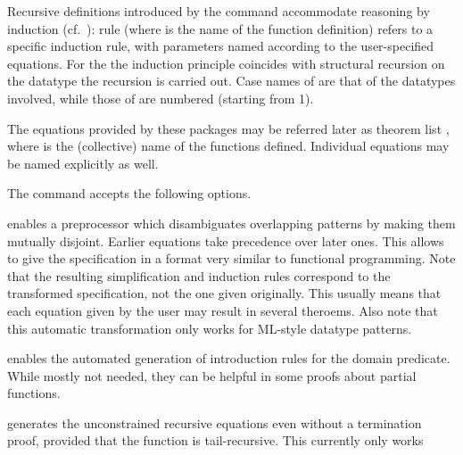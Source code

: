 \begin{isabellebody}
\begin{isamarkuptext}
\begin{description}
  \end{description}


  Recursive definitions introduced by the \hyperlink{command.HOL.function}{\mbox{}}
  command accommodate
  reasoning by induction (cf.\ ): rule  (where  is the name of the function definition)
  refers to a specific induction rule, with parameters named according
  to the user-specified equations.
  For the \hyperlink{command.HOL.primrec}{\mbox{}} the induction principle coincides
  with structural recursion on the datatype the recursion is carried
  out.
  Case names of \hyperlink{command.HOL.primrec}{\mbox{}} are that of the datatypes involved, while those of
  \hyperlink{command.HOL.function}{\mbox{}} are numbered (starting from 1).

  The equations provided by these packages may be referred later as
  theorem list , where  is the (collective)
  name of the functions defined.  Individual equations may be named
  explicitly as well.

  The \hyperlink{command.HOL.function}{\mbox{}} command accepts the following
  options.

  \begin{description}

  \item {} enables a preprocessor which disambiguates
  overlapping patterns by making them mutually disjoint.  Earlier
  equations take precedence over later ones.  This allows to give the
  specification in a format very similar to functional programming.
  Note that the resulting simplification and induction rules
  correspond to the transformed specification, not the one given
  originally. This usually means that each equation given by the user
  may result in several theroems.  Also note that this automatic
  transformation only works for ML-style datatype patterns.

  \item {} enables the automated generation of
  introduction rules for the domain predicate. While mostly not
  needed, they can be helpful in some proofs about partial functions.

  \item {} generates the unconstrained recursive
  equations even without a termination proof, provided that the
  function is tail-recursive. This currently only works


\end{description}
\end{isamarkuptext}
\end{isabellebody}
